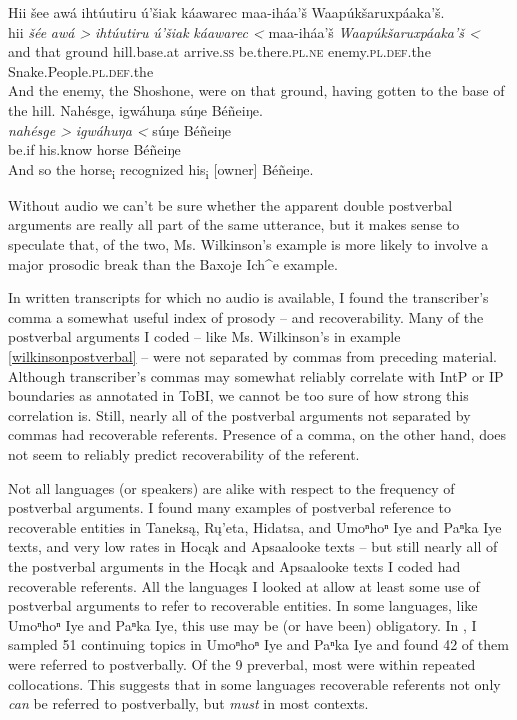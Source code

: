 \documentclass[output=paper]{LSP/langsci}
\begin{document}
\ea\label{multiplepostverbal}
\ea\label{wilkinsonmultiplepostverbal}
Hii šee awá ihtúutiru ú’šiak káawarec maa-iháa’š Waapúkšaruxpáaka’š.\footnotemark\\
\gll	hii 		\emph{šée} 		\emph{awá >}		\emph{ihtúutiru} 			\emph{ú’šiak} 		\emph{káawarec <}	maa-iháa’š 				\emph{Waapúkšaruxpáaka’š <}\\
	and 		that	 		ground 			hill.base.at	 			arrive.\textsc{ss} 		be.there.\textsc{pl.ne}	enemy.\textsc{pl.def}.the 		Snake.People.\textsc{pl.def}.the\\
\glt	And the enemy, the Shoshone, were on that ground, having gotten to the base of the hill.
\ex\label{baxojemultiplepostverbal}
Nahésge, igwáhuŋa súŋe Béñeiŋe.\footnotemark\\
\gll	\emph{nahésge >}	\emph{igwáhuŋa <}	súŋe 		Béñeiŋe\\
	be.if 			his.know 			horse 		Béñeiŋe\\
\glt	And so the horse\textsubscript{i} recognized his\textsubscript{i} [owner] Béñeiŋe.
\z\z

Without audio we can’t be sure whether the apparent double postverbal arguments are really all part of the same utterance, but it makes sense to speculate that, of the two, Ms. Wilkinson’s example is more likely to involve a major prosodic break than the Baxoje Ich\^{}e example.

In written transcripts for which no audio is available, I found the transcriber’s comma a somewhat useful index of prosody -- and recoverability. Many of the postverbal arguments I coded -- like Ms. Wilkinson’s in example \ref{wilkinsonpostverbal} -- were not separated by commas from preceding material. Although transcriber’s commas may somewhat reliably correlate with IntP or IP boundaries as annotated in ToBI, we cannot be too sure of how strong this correlation is. Still, nearly all of the postverbal arguments not separated by commas had recoverable referents. Presence of a comma, on the other hand, does not seem to reliably predict recoverability of the referent.

Not all languages (or speakers) are alike with respect to the frequency of postverbal arguments. I found many examples of postverbal reference to recoverable entities in Taneksą, Rų’eta, Hidatsa, and Umoⁿhoⁿ Iye and Paⁿka Iye texts, and very low rates in Hocąk and Apsaalooke texts -- but still nearly all of the postverbal arguments in the Hocąk and Apsaalooke texts I coded had recoverable referents. All the languages I looked at allow at least some use of postverbal arguments to refer to recoverable entities. In some languages, like Umoⁿhoⁿ Iye and Paⁿka Iye, this use may be (or have been) obligatory. In \citet{Gordon2008}, I sampled 51 continuing topics in Umoⁿhoⁿ Iye and Paⁿka Iye and found 42 of them were referred to postverbally. Of the 9 preverbal, most were within repeated collocations. This suggests that in some languages recoverable referents not only \emph{can} be referred to postverbally, but \emph{must} in most contexts.
\end{document}
